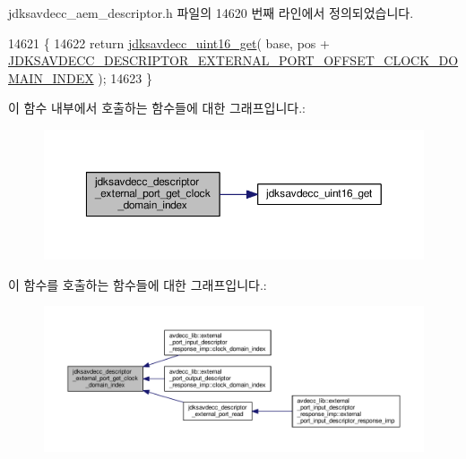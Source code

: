 jdksavdecc\+\_\+aem\+\_\+descriptor.\+h 파일의 14620 번째 라인에서 정의되었습니다.


\begin{DoxyCode}
14621 \{
14622     \textcolor{keywordflow}{return} \hyperlink{group__endian_ga3fbbbc20be954aa61e039872965b0dc9}{jdksavdecc\_uint16\_get}( base, pos + 
      \hyperlink{group__descriptor__external__port_ga01e5e4f58785a82fb878bd5a8cb42858}{JDKSAVDECC\_DESCRIPTOR\_EXTERNAL\_PORT\_OFFSET\_CLOCK\_DOMAIN\_INDEX}
       );
14623 \}
\end{DoxyCode}


이 함수 내부에서 호출하는 함수들에 대한 그래프입니다.\+:
\nopagebreak
\begin{figure}[H]
\begin{center}
\leavevmode
\includegraphics[width=350pt]{group__descriptor__external__port_gacb1f51a04c7235612fb57dabf0f95c34_cgraph}
\end{center}
\end{figure}




이 함수를 호출하는 함수들에 대한 그래프입니다.\+:
\nopagebreak
\begin{figure}[H]
\begin{center}
\leavevmode
\includegraphics[width=350pt]{group__descriptor__external__port_gacb1f51a04c7235612fb57dabf0f95c34_icgraph}
\end{center}
\end{figure}


